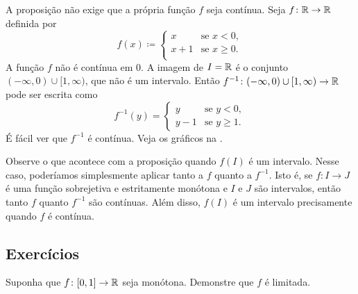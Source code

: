 \begin{example}
A proposição não exige que a própria função $f$ seja contínua. Seja
$f \colon {\mathbb{R}} \to {\mathbb{R}}$ definida por
\begin{equation*}
f(x) \coloneqq
\begin{cases}
x & \text{se } x < 0, \\
x+1 & \text{se } x \geq 0. \\
\end{cases}
\end{equation*}
A função $f$ não é contínua em $0$.
A imagem de $I = {\mathbb{R}}$ é o conjunto
$(-\infty,0)\cup [1,\infty)$, que não é um intervalo.
Então $f^{-1} \colon (-\infty,0)\cup [1,\infty)
\to {\mathbb{R}}$ pode ser escrita como
\begin{equation*}
f^{-1}(y) =
\begin{cases}
y & \text{se } y < 0, \\
y-1 & \text{se } y \geq 1.
\end{cases}
\end{equation*}
É fácil ver que $f^{-1}$ é contínua. Veja os gráficos na
.
\begin{myfigureht}
\caption{Gráficos de $f$, à esquerda, e de $f^{-1}$, à direita.\label{invcontfig}}
\end{myfigureht}
\end{example}

Observe o que acontece com a proposição quando $f(I)$ é um intervalo.
Nesse caso, poderíamos simplesmente
aplicar  tanto a $f$ quanto a $f^{-1}$. Isto é, se
$f \colon I \to J$ é uma função sobrejetiva e estritamente monótona e $I$ e $J$ são intervalos,
então tanto $f$ quanto $f^{-1}$ são contínuas. Além disso, $f(I)$ é um
intervalo precisamente quando $f$ é contínua.

\subsection{Exercícios}

\begin{exercise}
Suponha que $f \colon [0,1] \to {\mathbb{R}}$ seja monótona. Demonstre que $f$ é limitada.
\end{exercise}

